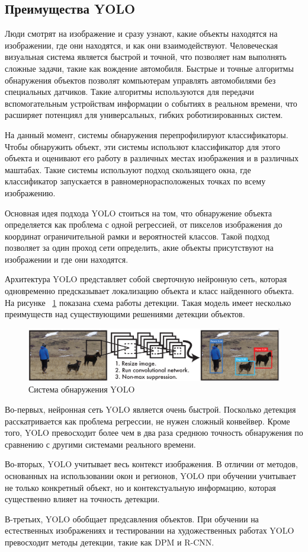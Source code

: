 \documentclass[a4paper,english,russian]{G2-105}
\begin{document}
\subsection{Преимущества YOLO}
\par Люди смотрят на изображение и сразу узнают, какие объекты находятся на изображении, где они находятся, и как они взаимодействуют. Человеческая визуальная система является быстрой и точной, что позволяет нам выполнять сложные задачи, такие как вождение автомобиля. Быстрые и точные алгоритмы обнаружения объектов позволят компьютерам управлять автомобилями без специальных датчиков. Такие алгоритмы используются для передачи вспомогательным устройствам информации о событиях в реальном времени, что расширяет потенциял для универсальных, гибких роботизированных систем.
\par На данный момент, системы обнаружения перепрофилируют классификаторы. Чтобы обнаружить объект, эти системы использют классификатор для этого объекта и оценивают его работу в различных местах изображения и в различных маштабах. Такие системы используют подход скользящего окна, где классификатор запускается в равномернорасположеных точках по всему изображению.
\par Основная идея подхода YOLO стоиться на том, что обнаружение объекта определяется как проблема с одной регрессией, от пикселов изображения до координат ограничительной рамки и вероятностей классов. Такой подход позволяет за один проход сети определить, акие объекты присутствуют на изображении и где они находятся.
\par Архитектура YOLO представляет собой сверточную нейронную сеть, которая одновременно предсказывает локализацию объекта и класс найденного объекта. На рисунке ~\ref{yolo} показана схема работы детекции. Такая модель имеет несколько преимуществ над существующими решениями детекции объектов.
\begin{figure}
    \includegraphics[width=\linewidth]{yolo.png}
    \caption{Система обнаружения YOLO}
	\label{yolo}
\end{figure}
\par Во-первых, нейронная сеть YOLO является очень быстрой. Посколько детекция расскатривается как проблема регрессии, не нужен сложный конвейвер. Кроме того, YOLO превосходит более чем в два раза среднюю точность обнаружения по сравнению с другими системами реального времени.
\par Во-вторых, YOLO учитывает весь контекст изображения. В отличии от методов, основанных на использовании окон и регионов, YOLO при обучении учитывает не только конкретный объект, но и контекстуальную информацию, которая существенно влияет на точность детекции. 
\par В-третьих, YOLO обобщает предсавления объектов. При обучении на естественных изображениях и тестировании на художественных работах YOLO превосходит методы детекции, такие как DPM и R-CNN.
\end{document}
